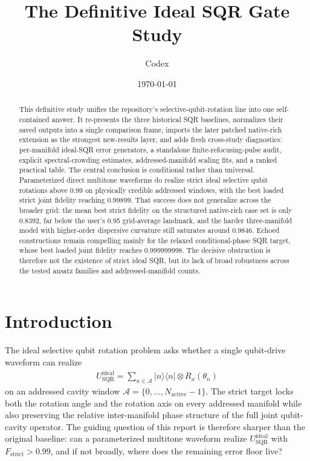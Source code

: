 \documentclass[aps,pra,twocolumn,reprint,floatfix,amsmath,amssymb]{revtex4-2}
\begin{document}
\sloppy
\title{The Definitive Ideal SQR Gate Study}
\author{Codex}
\date{\today}
\begin{abstract}
This definitive study unifies the repository's selective-qubit-rotation line into one self-contained answer. It re-presents the three historical SQR baselines, normalizes their saved outputs into a single comparison frame, imports the later patched native-rich extension as the strongest new-results layer, and adds fresh cross-study diagnostics: per-manifold ideal-SQR error generators, a standalone finite-refocusing-pulse audit, explicit spectral-crowding estimates, addressed-manifold scaling fits, and a ranked practical table. The central conclusion is conditional rather than universal. Parameterized direct multitone waveforms do realize strict ideal selective qubit rotations above 0.99 on physically credible addressed windows, with the best loaded strict joint fidelity reaching 0.99899. That success does not generalize across the broader grid: the mean best strict fidelity on the structured native-rich case set is only 0.8392, far below the user's 0.95 grid-average landmark, and the harder three-manifold model with higher-order dispersive curvature still saturates around 0.9846. Echoed constructions remain compelling mainly for the relaxed conditional-phase SQR target, whose best loaded joint fidelity reaches 0.999999998. The decisive obstruction is therefore not the existence of strict ideal SQR, but its lack of broad robustness across the tested ansatz families and addressed-manifold counts.
\end{abstract}
\maketitle

\section{Introduction}
The ideal selective qubit rotation problem asks whether a single qubit-drive waveform can realize
\begin{align}
U_{\mathrm{SQR}}^{\mathrm{ideal}}
=
\sum_{n\in\mathcal{A}} |n\rangle\langle n| \otimes R_x(\theta_n)
\end{align}
on an addressed cavity window $\mathcal{A}=\{0,\ldots,N_{\mathrm{active}}-1\}$. The strict target locks both the rotation angle and the rotation axis on every addressed manifold while also preserving the relative inter-manifold phase structure of the full joint qubit-cavity operator. The guiding question of this report is therefore sharper than the original baseline: can a parameterized multitone waveform realize $U_{\mathrm{SQR}}^{\mathrm{ideal}}$ with $F_{\mathrm{strict}}>0.99$, and if not broadly, where does the remaining error floor live?
\end{document}
